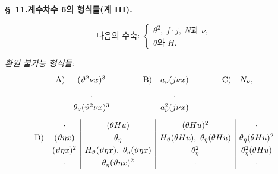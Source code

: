 
\begin{center}
\textbf{\S\ 11.\quad 계수차수 6의 형식들(계 III).}
\end{center}
\[
\text{다음의 수축: }\left\{\begin{array}{l}
\theta^2,\ f\cdot j,\ N \text{과 }\nu,\\
\theta\text{와 }H.
\end{array}\right.
\]


\noindent\emph{환원 불가능 형식들:}
\[
\renewcommand{\arraystretch}{1.25}
\begin{array}{@{}r@{\quad}c@{\qquad\qquad}r@{\quad}c@{\qquad\qquad}r@{\quad}c@{}}
\text{A)}&(\vartheta^2\nu x)^3&\text{B)}&a_\nu(j\nu x)&\text{C)}&N_\nu,\\[0.45em]
&\cdot&&\cdot&&\\[-0.1em]
&\theta_\nu(\vartheta^2\nu x)^3&&a_\nu^2(j\nu x)&&
\end{array}
\]
\[
\renewcommand{\arraystretch}{1.25}
\begin{array}{@{}r@{\quad}c|c|c|c@{}}
&\cdot&(\theta Hu)&(\theta Hu)^2&\cdot\\
\text{D)}&(\vartheta\eta x)&\theta_\eta&H_\vartheta(\theta Hu),\ \theta_\eta(\theta Hu)&\theta_\eta(\theta Hu)^2\\
&(\vartheta\eta x)^2&H_\vartheta(\vartheta\eta x),\ \theta_\eta(\vartheta\eta x)&\theta_\eta^2&\theta_\eta^2(\theta Hu)\\
&\cdot&\theta_\eta(\vartheta\eta x)^2&\cdot&\cdot
\end{array}
\]
